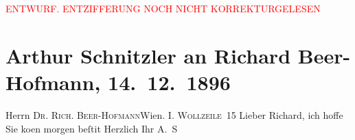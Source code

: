 
\begin{center}
            \textcolor{red}{ENTWURF. ENTZIFFERUNG NOCH NICHT KORREKTURGELESEN}
                      \end{center}
            
               \section[Arthur Schnitzler an Richard Beer-Hofmann, 14. 12. 1896]{ Arthur Schnitzler an Richard Beer-Hofmann, 14. 12. 1896}\nopagebreak{}\rehead{ }\begin{ledgroupsized}[t]{13cm}\normalsize\beginnumbering{} \toendnotes[C]{\smallbreak\pagebreak[2]} 
\pstart{}{\pb}Herrn \textsc{Dr. Rich. Beer-Hofmann}\pend{}\pstart{}Wien.
               \pend{}\pstart{}\textsc{I. Wollzeile 15}\pend{}{\bigskip}\pstart
           \noindent{}{\pb}Lieber Richard, ich hoffe Sie
                  ko{\geminationm}en morgen beſti{\geminationm}t\pend
           \pstart Herzlich Ihr \spacefill\mbox{A. S}\pend{}\endnumbering{}\end{ledgroupsized}  \newcommand{\dateiname}{L00628}\newcommand{\titel}{Arthur Schnitzler an Richard Beer-Hofmann, 14. 12. 1896}\newcommand{\editorInnen}{Martin Anton Müller und Gerd-Hermann Susen}
      